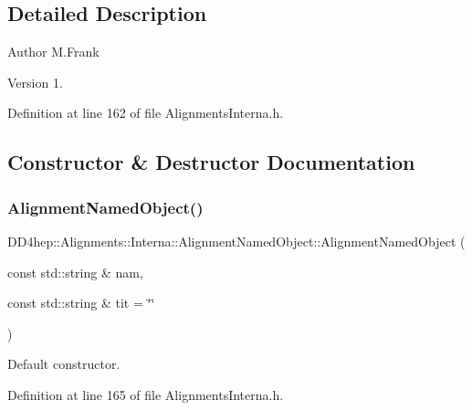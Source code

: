 \subsection{Detailed Description}
\begin{DoxyAuthor}{Author}
M.\+Frank 
\end{DoxyAuthor}
\begin{DoxyVersion}{Version}
1. 
\end{DoxyVersion}


Definition at line 162 of file Alignments\+Interna.\+h.



\subsection{Constructor \& Destructor Documentation}
\hypertarget{class_d_d4hep_1_1_alignments_1_1_interna_1_1_alignment_named_object_a0446fa258b55e441adae43fd5f1c20e8}{}\label{class_d_d4hep_1_1_alignments_1_1_interna_1_1_alignment_named_object_a0446fa258b55e441adae43fd5f1c20e8} 
\subsubsection{\texorpdfstring{Alignment\+Named\+Object()}{AlignmentNamedObject()}}
{\footnotesize\ttfamily D\+D4hep\+::\+Alignments\+::\+Interna\+::\+Alignment\+Named\+Object\+::\+Alignment\+Named\+Object (\begin{DoxyParamCaption}\item[{const std\+::string \&}]{nam,  }\item[{const std\+::string \&}]{tit = {\ttfamily \char`\"{}\char`\"{}} }\end{DoxyParamCaption})\hspace{0.3cm}{\ttfamily [inline]}}



Default constructor. 



Definition at line 165 of file Alignments\+Interna.\+h.

\hypertarget{class_d_d4hep_1_1_alignments_1_1_interna_1_1_alignment_named_object_a96f03450aa9af33962d86b7067473939}{}\label{class_d_d4hep_1_1_alignments_1_1_interna_1_1_alignment_named_object_a96f03450aa9af33962d86b7067473939} 
